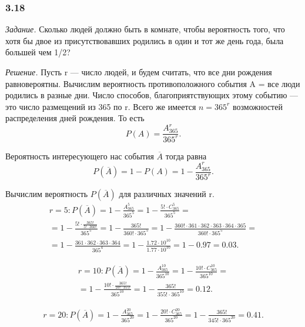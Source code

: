 \subsubsection*{3.18}

\textit{Задание.} Сколько людей должно быть в комнате, чтобы вероятность того, что хотя бы двое из присутствовавших родились в один и тот же день года, была большей чем 1/2?

\textit{Решение.} Пусть r --- число людей, и будем считать, что все дни рождения равновероятны.
Вычислим вероятность противоположного события A = {все люди родились в разные дни}.
Число способов, благоприятствующих этому событию --- это число размещений из 365 по r.
Всего же имеется $ n = 365^r $ возможностей распределения дней рождения.
То есть
$$ P(A) =
\frac{A_{365}^r}{365^r}.$$

Вероятность интересующего нас события $ \overline{A} $ тогда равна
$$ P \left( \overline{A} \right) =
1 - P \left( A \right) =
1 - \frac{A_{365}^r}{365^r}.$$

Вычислим вероятность $ P \left( \overline{A} \right) $ для различных значений r.
\begin{equation*}
\begin{split}
r = 5 : P \left( \overline{A} \right) =
1 - \frac{A_{365}^5}{365^5} =
1 - \frac{5! \cdot C_{365}^5}{365^5} = \\
= 1 - \frac{5! \cdot \frac{365!}{5! \cdot 360!} }{365^5} =
1 - \frac{365!}{360! \cdot 365^5} =
1 - \frac{360! \cdot 361 \cdot 362 \cdot 363 \cdot 364 \cdot 365}{360! \cdot 365^5} = \\
= 1 - \frac{361 \cdot 362 \cdot 363 \cdot 364}{365^4} =
1 - \frac{1.72 \cdot 10^10}{1.77 \cdot 10^10} =
1 - 0.97 =
0.03.
\end{split}
\end{equation*}

\begin{equation*}
\begin{split}
r = 10 :
P \left( \overline{A} \right) =
1 - \frac{A_{365}^{10}}{365^{10}} =
1- \frac{10! \cdot C_{365}^{10}}{365^{10}} = \\
= 1 - \frac{10! \cdot \frac{365!}{10! \cdot 355!}}{365^{10}} =
1 - \frac{365!}{355! \cdot 365^{10}} =
0.12.
\end{split}
\end{equation*}

\begin{equation*}
\begin{split}
r = 20 :
P \left( \overline{A} \right) =
1 - \frac{A_{365}^{20}}{365^{20}} =
1 - \frac{20! \cdot C_{365}^{20}}{365^{20}} =
1 - \frac{365!}{345! \cdot 365^{20}} =
0.41.
\end{split}
\end{equation*}

